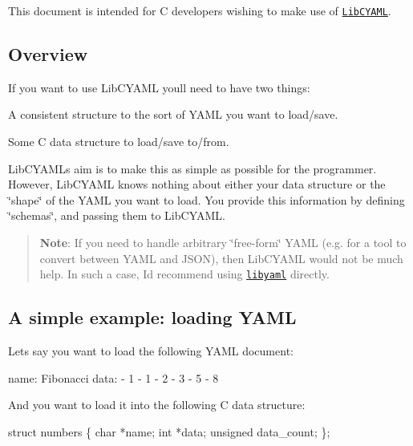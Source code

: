 This document is intended for C developers wishing to make use of \href{https://github.com/tlsa/libcyaml}{\tt Lib\+C\+Y\+A\+ML}.

\subsection*{Overview }

If you want to use Lib\+C\+Y\+A\+ML you\textquotesingle{}ll need to have two things\+:


\begin{DoxyEnumerate}
\item A consistent structure to the sort of Y\+A\+ML you want to load/save.
\item Some C data structure to load/save to/from.
\end{DoxyEnumerate}

Lib\+C\+Y\+A\+ML\textquotesingle{}s aim is to make this as simple as possible for the programmer. However, Lib\+C\+Y\+A\+ML knows nothing about either your data structure or the \char`\"{}shape\char`\"{} of the Y\+A\+ML you want to load. You provide this information by defining \char`\"{}schemas\char`\"{}, and passing them to Lib\+C\+Y\+A\+ML.

\begin{quote}
{\bfseries Note}\+: If you need to handle arbitrary \char`\"{}free-\/form\char`\"{} Y\+A\+ML (e.\+g. for a tool to convert between Y\+A\+ML and J\+S\+ON), then Lib\+C\+Y\+A\+ML would not be much help. In such a case, I\textquotesingle{}d recommend using \href{https://github.com/yaml/libyaml}{\tt libyaml} directly. \end{quote}


\subsection*{A simple example\+: loading Y\+A\+ML }

Let\textquotesingle{}s say you want to load the following Y\+A\+ML document\+:


\begin{DoxyCode}
name: Fibonacci
data:
  - 1
  - 1
  - 2
  - 3
  - 5
  - 8
\end{DoxyCode}


And you want to load it into the following C data structure\+:


\begin{DoxyCode}
\textcolor{keyword}{struct }numbers \{
    \textcolor{keywordtype}{char} *name;
    \textcolor{keywordtype}{int} *data;
    \textcolor{keywordtype}{unsigned} data\_count;
\};
\end{DoxyCode}


